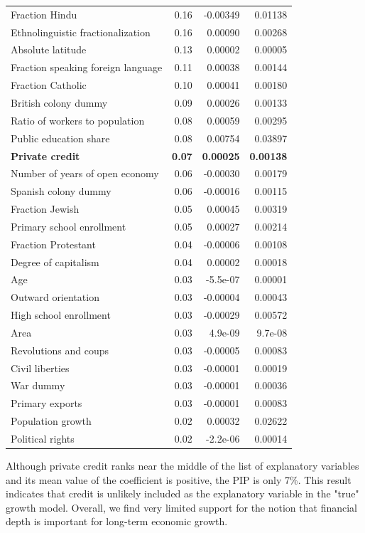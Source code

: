 \begin{table}[!ht]
\begin{tabular}{lrrr}
		Fraction Hindu & 0.16 & -0.00349 & 0.01138 \\ 
		Ethnolinguistic fractionalization & 0.16 & 0.00090 & 0.00268 \\ 
		Absolute latitude & 0.13 & 0.00002 & 0.00005 \\ 
		Fraction speaking foreign language & 0.11 & 0.00038 & 0.00144 \\ 
		Fraction Catholic & 0.10 & 0.00041 & 0.00180 \\ 
		British colony dummy & 0.09 & 0.00026 & 0.00133 \\ 
		Ratio of workers to population & 0.08 & 0.00059 & 0.00295 \\ 
		Public education share & 0.08 & 0.00754 & 0.03897 \\ 
		\textbf{Private credit} & \textbf{0.07} & \textbf{0.00025} & \textbf{0.00138} \\ 
		Number of years of open economy & 0.06 & -0.00030 & 0.00179 \\ 
		Spanish colony dummy & 0.06 & -0.00016 & 0.00115 \\ 
		Fraction Jewish & 0.05 & 0.00045 & 0.00319 \\ 
		Primary school enrollment & 0.05 & 0.00027 & 0.00214 \\ 
		Fraction Protestant & 0.04 & -0.00006 & 0.00108 \\ 
		Degree of capitalism & 0.04 & 0.00002 & 0.00018 \\ 
		Age & 0.03 & -5.5e-07 & 0.00001 \\ 
		Outward orientation & 0.03 & -0.00004 & 0.00043 \\ 
		High school enrollment & 0.03 & -0.00029 & 0.00572 \\ 
		Area & 0.03 & 4.9e-09 & 9.7e-08 \\ 
		Revolutions and coups & 0.03 & -0.00005 & 0.00083 \\ 
		Civil liberties & 0.03 & -0.00001 & 0.00019 \\ 
		War dummy & 0.03 & -0.00001 & 0.00036 \\ 
		Primary exports & 0.03 & -0.00001 & 0.00083 \\ 
		Population growth & 0.02 & 0.00032 & 0.02622 \\ 
		Political rights & 0.02 & -2.2e-06 & 0.00014 \\
		\bottomrule
	\end{tabular}
\end{table}
%

Although private credit ranks near the middle of the list of explanatory variables and its mean value of the coefficient is positive, the \ac{PIP} is only 7\%. This result indicates that credit is unlikely included as the explanatory variable in the "true" growth model. Overall, we find very limited support for the notion that financial depth is important for long-term economic growth.

